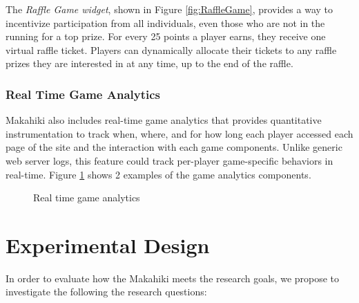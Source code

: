 \documentclass[11pt]{article}
\begin{document}
The {\em Raffle Game widget}, shown in Figure \ref{fig:RaffleGame}, provides a way to incentivize participation from all individuals, even those who are not in the running for a top prize. For every 25 points a player earns, they receive one virtual raffle ticket. Players can dynamically allocate their tickets to any raffle prizes they are interested in at any time, up to the end of the raffle.

\subsubsection{Real Time Game Analytics}

Makahiki also includes real-time game analytics that provides quantitative instrumentation to track when, where, and for how long each player accessed each page of the site and the interaction with each game components.  Unlike generic web server logs, this feature could track per-player game-specific behaviors in real-time. Figure \ref{fig:status} shows 2 examples of the game analytics components.

\begin{figure}[ht!]
	\centering
		\caption{Real time game analytics}
		\label{fig:status}
\end{figure}

\section{Experimental Design}

In order to evaluate how the Makahiki meets the research goals, we propose to investigate the following the research questions:
\end{document}
